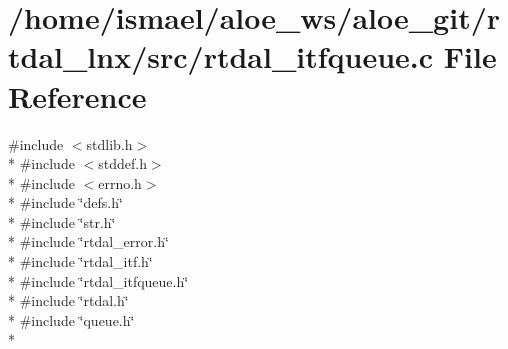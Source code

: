 \section{/home/ismael/aloe\-\_\-ws/aloe\-\_\-git/rtdal\-\_\-lnx/src/rtdal\-\_\-itfqueue.c File Reference}
\label{rtdal__itfqueue_8c}
{\ttfamily \#include $<$stdlib.\-h$>$}\\*
{\ttfamily \#include $<$stddef.\-h$>$}\\*
{\ttfamily \#include $<$errno.\-h$>$}\\*
{\ttfamily \#include \char`\"{}defs.\-h\char`\"{}}\\*
{\ttfamily \#include \char`\"{}str.\-h\char`\"{}}\\*
{\ttfamily \#include \char`\"{}rtdal\-\_\-error.\-h\char`\"{}}\\*
{\ttfamily \#include \char`\"{}rtdal\-\_\-itf.\-h\char`\"{}}\\*
{\ttfamily \#include \char`\"{}rtdal\-\_\-itfqueue.\-h\char`\"{}}\\*
{\ttfamily \#include \char`\"{}rtdal.\-h\char`\"{}}\\*
{\ttfamily \#include \char`\"{}queue.\-h\char`\"{}}\\*
